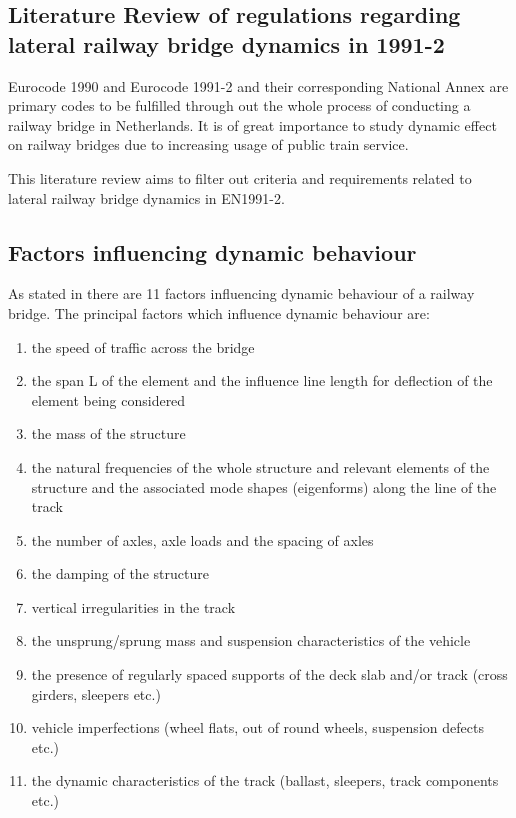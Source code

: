 \begin{appendices}

\chapter{Literature Review of regulations regarding lateral railway bridge dynamics in 1991-2} 
Eurocode 1990 and Eurocode 1991-2 and their corresponding National Annex are primary codes to be fulfilled through out the whole process of conducting a railway bridge in Netherlands. It is of great importance to study dynamic effect on railway bridges due to increasing usage of public train service.

This literature review aims to filter out criteria and requirements related to lateral railway bridge dynamics in EN1991-2.


\section{Factors influencing dynamic behaviour}
As stated in\citet[6.4.2]{EC12} there are 11 factors influencing dynamic behaviour of a railway bridge. The principal factors which influence dynamic behaviour are:
\begin{enumerate}[-]
	\item the speed of traffic across the bridge
	\item the span L of the element and the influence line length for deflection of the element being considered
	\item the mass of the structure
	\item the natural frequencies of the whole structure and relevant elements of the structure and the associated mode shapes (eigenforms) along the line of the track
	\item the number of axles, axle loads and the spacing of axles
	\item the damping of the structure
	\item vertical irregularities in the track
	\item the unsprung/sprung mass and suspension characteristics of the vehicle
	\item the presence of regularly spaced supports of the deck slab and/or track (cross girders, sleepers etc.)
	\item vehicle imperfections (wheel flats, out of round wheels, suspension defects etc.)
	\item the dynamic characteristics of the track (ballast, sleepers, track components etc.)
\end{enumerate}


\end{appendices}

